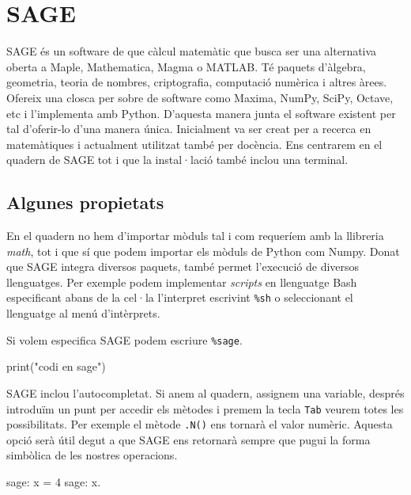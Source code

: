 \chapter{SAGE}


SAGE és un software de que càlcul matemàtic que busca ser una alternativa oberta a Maple, Mathematica, Magma o MATLAB. Té paquets d'àlgebra, geometria, teoria de nombres, criptografia, computació numèrica i altres àrees. Ofereix una closca per sobre de software como Maxima, NumPy, SciPy, Octave, etc i l'implementa amb Python. D'aquesta manera junta el software existent per tal d'oferir-lo d'una manera única. Inicialment va ser creat per a recerca en matemàtiques i actualment utilitzat també per docència. Ens centrarem en el quadern de SAGE tot i que la instal·lació també inclou una terminal.



\section{Algunes propietats}

En el quadern no hem d'importar mòduls tal i com requeríem amb la llibreria \emph{math}, tot i que sí que podem importar els mòduls de Python com Numpy. Donat que SAGE integra diversos paquets, també permet l'execució de diversos llenguatges. Per exemple podem implementar \emph{scripts} en llenguatge Bash especificant abans de la cel·la l'interpret escrivint {\tt \%sh} o seleccionant el llenguatge al menú d'intèrprets.



Si volem especifica SAGE podem escriure {\tt \%sage}.

\begin{blockcode}
print("codi en sage")
\end{blockcode}


SAGE inclou l'autocompletat. Si anem al quadern, assignem una variable, després introduïm un punt per accedir els mètodes i premem la tecla {\tt Tab} veurem totes les possibilitats. Per exemple el mètode {\tt .N()} ens tornarà el valor numèric. Aquesta opció serà útil degut a que SAGE ens retornarà sempre que pugui la forma simbòlica de les nostres operacions.


\begin{blockcode}
sage: x = 4
sage: x.
\end{blockcode}


